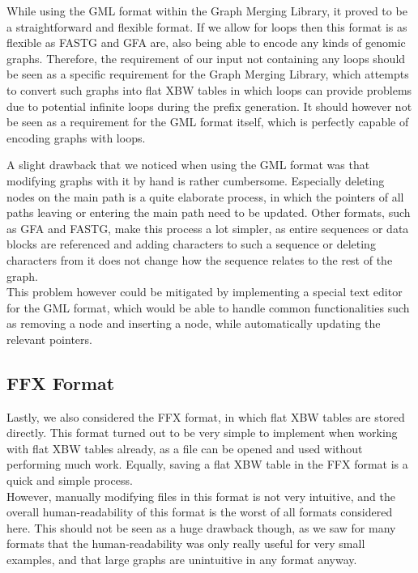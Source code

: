 \documentclass[a4paper,12pt,twoside,BCOR=10mm]{scrbook}
\begin{document}
While using the GML format within the Graph Merging Library,
it proved to be a straightforward and flexible format.
If we allow for loops then this format is as flexible as FASTG and GFA are,
also being able to encode any kinds of genomic graphs.
Therefore, the requirement of our input not containing any loops should be
seen as a specific requirement for the Graph Merging Library, which attempts
to convert such graphs into flat XBW tables in which loops can provide problems
due to potential infinite loops during the prefix generation.
It should however not be seen as a requirement for the GML format itself,
which is perfectly capable of encoding graphs with loops.

A slight drawback that we noticed when using the GML format was that
modifying graphs with it by hand is rather cumbersome.
Especially deleting nodes on the main path is a quite elaborate process,
in which the pointers of all paths leaving or entering the main path
need to be updated.
Other formats, such as GFA and FASTG, make this process a lot simpler,
as entire sequences or data blocks are referenced and adding characters to such a
sequence or deleting characters from it does not change how the sequence
relates to the rest of the graph. \\
This problem however could be mitigated by implementing a special text editor
for the GML format, which would be able to handle common functionalities such as
removing a node and inserting a node, while automatically updating the relevant pointers.

\subsection{FFX Format}

Lastly, we also considered the FFX format, in which flat XBW tables are stored directly.
This format turned out to be very simple to implement when working with flat XBW tables already,
as a file can be opened and used without performing much work. Equally, saving a flat XBW table
in the FFX format is a quick and simple process. \\
However, manually modifying files in this format is not very intuitive,
and the overall human-readability of this format is the worst of all formats considered here.
This should not be seen as a huge drawback though, as we saw for many formats that the human-readability was
only really useful for very small examples, and that large graphs are unintuitive in any format anyway.
\end{document}
